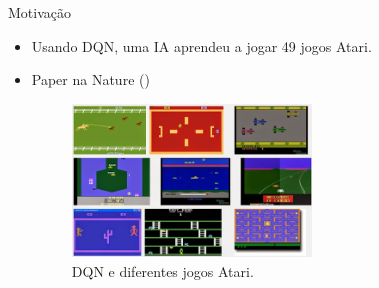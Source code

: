 \documentclass{beamer}
\begin{document}

\begin{frame}{Motivação}
\begin{itemize}
\item
	Usando DQN, uma IA aprendeu a jogar 49 jogos Atari.
\item
	Paper na Nature (\cite{RLNature2015})
	\begin{figure}
	\centering
    \includegraphics[width=0.6\textwidth]{figures/atari.jpg} 
    \caption{DQN e diferentes jogos Atari.}
    \label{fig:alphago}
\end{figure}	
\end{itemize}
\end{frame}
\end{document}
